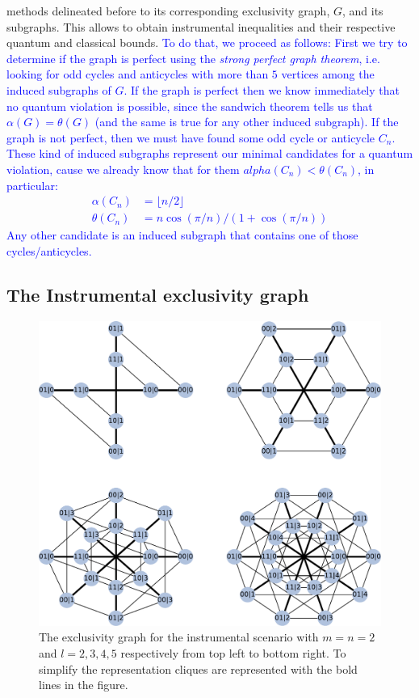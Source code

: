 \documentclass[letterpaper]{article}
\begin{document}
methods delineated before to its corresponding exclusivity graph, $G$,
and its subgraphs. This allows to obtain instrumental inequalities and
their respective quantum and classical bounds.
\textcolor{blue}{
To do that, we proceed as follows:
First we try to determine if the graph is perfect using the \emph{strong
perfect graph theorem}, i.e. looking for odd cycles and anticycles with
more than $5$ vertices among the induced subgraphs of $G$.
If the graph is perfect then we know immediately that no quantum violation
is possible, since the sandwich theorem tells us that $\alpha(G) =
\theta(G)$ (and the same is true for any other induced subgraph).
If the graph is not perfect, then we must have found some odd cycle or
anticycle $C_n$. These kind of induced subgraphs represent our minimal
candidates for a quantum violation, cause we already know that for them
$alpha(C_n) < \theta(C_n)$, in particular:
\begin{equation}
\begin{aligned}
    \alpha(C_n) &= \lfloor n/2 \rfloor \\ 
    \theta(C_n) &= n\cos(\pi/n)/(1+\cos(\pi/n))
\end{aligned}
\label{eq:cycle_alpha_theta}
\end{equation}
Any other candidate is an induced subgraph that contains one of those
cycles/anticycles.
}

\subsection{The Instrumental exclusivity graph}
\begin{figure}[t]
    \centering
    \includegraphics[width=\columnwidth]{images/instrumental_exgraph.pdf}
    \caption{
    The exclusivity graph for the instrumental scenario with $m = n =2$ and $l=2,3,4,5$
    respectively from top left to bottom right. 
    To simplify the representation cliques are represented with the bold lines
    in the figure.}
    \label{fig:instrumental_exgraphs}
\end{figure}
\end{document}
